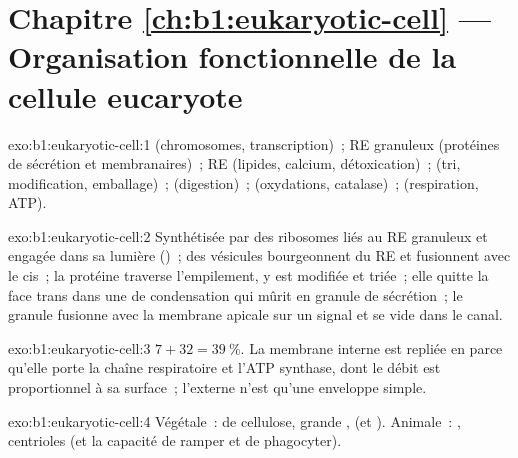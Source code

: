 \section*{Chapitre \ref{ch:b1:eukaryotic-cell} --- Organisation fonctionnelle de la cellule eucaryote}

\begin{solution}{exo:b1:eukaryotic-cell:1}
 (chromosomes, transcription)~; RE granuleux (protéines de
sécrétion et membranaires)~; RE  (lipides, calcium,
détoxication)~;  (tri, modification, emballage)~; 
(digestion)~;  (oxydations, catalase)~; 
(respiration, ATP).
\end{solution}

\begin{solution}{exo:b1:eukaryotic-cell:2}
Synthétisée par des ribosomes liés au RE granuleux et engagée dans sa
lumière ()~; des vésicules bourgeonnent du RE et
fusionnent avec le  cis~; la protéine traverse l'empilement, y est
modifiée et triée~; elle quitte la face trans dans une  de
condensation qui mûrit en granule de sécrétion~; le granule fusionne
avec la membrane apicale sur un signal et se vide dans le canal.
\end{solution}

\begin{solution}{exo:b1:eukaryotic-cell:3}
$7 + 32 = \qty{39}{\%}$. La membrane interne est repliée en 
parce qu'elle porte la chaîne respiratoire et l'ATP synthase, dont le
débit est proportionnel à sa surface~; l'externe n'est qu'une enveloppe
simple.
\end{solution}

\begin{solution}{exo:b1:eukaryotic-cell:4}
Végétale~:  de cellulose, grande ,  (et
). Animale~: , centrioles (et la capacité de ramper
et de phagocyter).
\end{solution}


